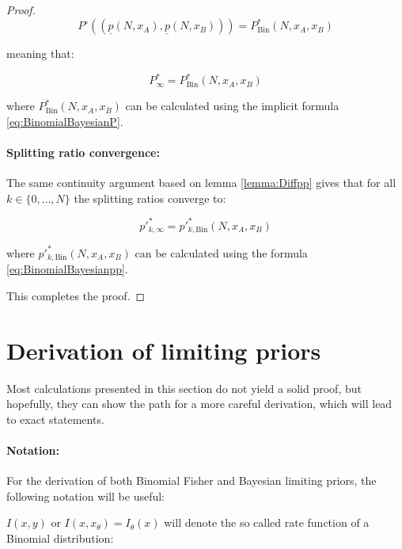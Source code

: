 \documentclass{article}
\theoremstyle{definition}
\begin{document}
\begin{proof}
\begin{equation}
    P^\circ((\underline{p}(N,x_A),\underline{p}(N,x_B))) = P^*_\text{Bin}(N,x_A,x_B)
\end{equation}

meaning that:

\begin{equation}
    P^*_\infty = P^*_\text{Bin}(N,x_A,x_B)
\end{equation}

where $P^*_\text{Bin}(N,x_A,x_B)$ can be calculated using the implicit formula \eqref{eq:BinomialBayesianP}.

\paragraph{Splitting ratio convergence:}

The same continuity argument based on lemma \ref{lemma:Diffpp} gives that for all $k \in \{0,\dots,N\}$ the splitting ratios converge to:

\begin{equation}
    p'^*_{k,\infty} = p'^*_{k,\mathrm{Bin}}(N,x_A,x_B)
\end{equation}

where $p'^*_{k,\mathrm{Bin}}(N,x_A,x_B)$ can be calculated using the formula \eqref{eq:BinomialBayesianpp}.

This completes the proof.
    
\end{proof}



\section{Derivation of limiting priors}
\label{appendix:Limiting}

Most calculations presented in this section do not yield a solid proof, but hopefully, they can show the path for a more careful derivation, which will lead to exact statements.

\paragraph{Notation:}

For the derivation of both Binomial Fisher and Bayesian limiting priors, the following notation will be useful:

$I(x,y)$ or $I(x,x_\theta)=I_\theta(x)$ will denote the so called rate function \cite{book:LargeDeviation, book:LargeDeviation2, arxiv:LDP} of a Binomial distribution:
\end{document}
